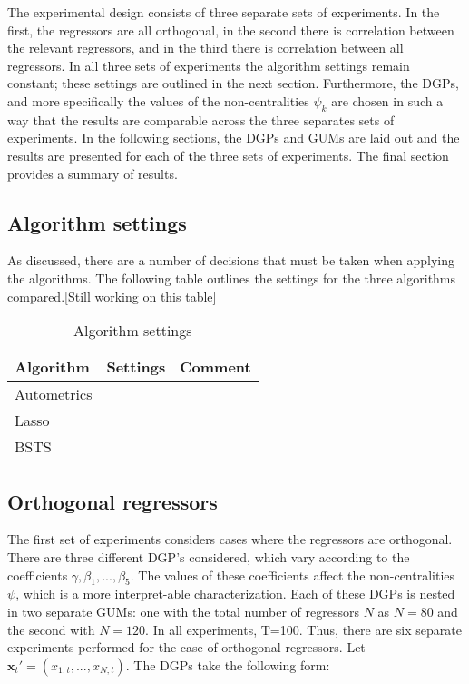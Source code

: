 \documentclass[11pt, oneside]{book}   	%
\begin{document}
The experimental design consists of three separate sets of experiments. In the first, the regressors are all orthogonal, in the second there is correlation between the relevant regressors, and in the third there is correlation between all regressors. In all three sets of experiments the algorithm settings remain constant; these settings are outlined in the next section. Furthermore, the DGPs, and more specifically the values of the non-centralities $\psi_{k}$ are chosen in such a way that the results are comparable across the three separates sets of experiments. In the following sections, the DGPs and GUMs are laid out and the results are presented for each of the three sets of experiments. The final section provides a summary of results.

\subsection{Algorithm settings}

As discussed, there are a number of decisions that must be taken when applying the algorithms. The following table outlines the settings for the three algorithms compared.[Still working on this table]

\begin{table}[h]
\centering
\begin{tabular}{l|l|l}

Algorithm& Settings & Comment  \\
\hline
Autometrics & & \\
\hline
Lasso & &\\
\hline
BSTS & &\\

    
\end{tabular}
\caption{Algorithm settings}
\label{AlgoSettings}
\end{table}






\subsection{Orthogonal regressors}

The first set of experiments considers cases where the regressors are orthogonal. There are three different DGP's considered, which vary according to the coefficients $\gamma,\beta_{1},...,\beta_{5}$. The values of these coefficients affect the non-centralities $\psi$, which is a more interpret-able characterization. Each of these DGPs is nested in two separate GUMs: one with the total number of regressors $N$ as $N=80$ and the second with $N=120$. In all experiments, T=100. Thus, there are six separate experiments performed for the case of orthogonal regressors.   Let $\textbf{x}_{t}'=(x_{1,t},...,x_{N,t})$. The DGPs take the following form: 
\end{document}
